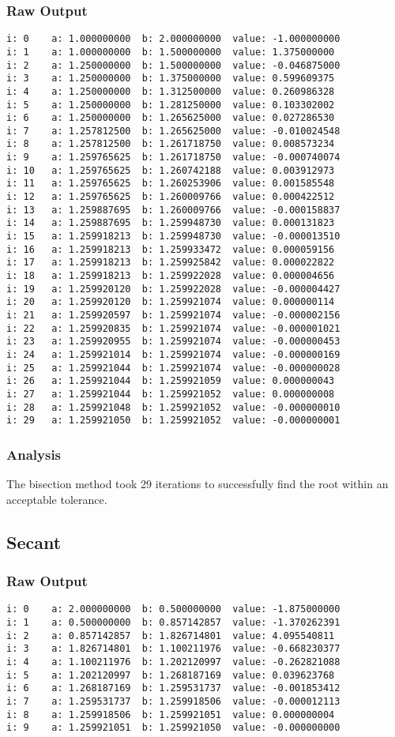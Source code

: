 \documentclass[11pt]{article} %
\begin{document}
\subsubsection*{Raw Output}
\begin{verbatim}
i: 0	a: 1.000000000	b: 2.000000000	value: -1.000000000 
i: 1	a: 1.000000000	b: 1.500000000	value: 1.375000000 
i: 2	a: 1.250000000	b: 1.500000000	value: -0.046875000 
i: 3	a: 1.250000000	b: 1.375000000	value: 0.599609375 
i: 4	a: 1.250000000	b: 1.312500000	value: 0.260986328 
i: 5	a: 1.250000000	b: 1.281250000	value: 0.103302002 
i: 6	a: 1.250000000	b: 1.265625000	value: 0.027286530 
i: 7	a: 1.257812500	b: 1.265625000	value: -0.010024548 
i: 8	a: 1.257812500	b: 1.261718750	value: 0.008573234 
i: 9	a: 1.259765625	b: 1.261718750	value: -0.000740074 
i: 10	a: 1.259765625	b: 1.260742188	value: 0.003912973 
i: 11	a: 1.259765625	b: 1.260253906	value: 0.001585548 
i: 12	a: 1.259765625	b: 1.260009766	value: 0.000422512 
i: 13	a: 1.259887695	b: 1.260009766	value: -0.000158837 
i: 14	a: 1.259887695	b: 1.259948730	value: 0.000131823 
i: 15	a: 1.259918213	b: 1.259948730	value: -0.000013510 
i: 16	a: 1.259918213	b: 1.259933472	value: 0.000059156 
i: 17	a: 1.259918213	b: 1.259925842	value: 0.000022822 
i: 18	a: 1.259918213	b: 1.259922028	value: 0.000004656 
i: 19	a: 1.259920120	b: 1.259922028	value: -0.000004427 
i: 20	a: 1.259920120	b: 1.259921074	value: 0.000000114 
i: 21	a: 1.259920597	b: 1.259921074	value: -0.000002156 
i: 22	a: 1.259920835	b: 1.259921074	value: -0.000001021 
i: 23	a: 1.259920955	b: 1.259921074	value: -0.000000453 
i: 24	a: 1.259921014	b: 1.259921074	value: -0.000000169 
i: 25	a: 1.259921044	b: 1.259921074	value: -0.000000028 
i: 26	a: 1.259921044	b: 1.259921059	value: 0.000000043 
i: 27	a: 1.259921044	b: 1.259921052	value: 0.000000008 
i: 28	a: 1.259921048	b: 1.259921052	value: -0.000000010 
i: 29	a: 1.259921050	b: 1.259921052	value: -0.000000001 
\end{verbatim}

\subsubsection*{Analysis}
The bisection method took 29 iterations to successfully find the root within an acceptable tolerance.
\subsection*{Secant}
\subsubsection*{Raw Output}
\begin{verbatim}
i: 0	a: 2.000000000	b: 0.500000000	value: -1.875000000
i: 1	a: 0.500000000	b: 0.857142857	value: -1.370262391
i: 2	a: 0.857142857	b: 1.826714801	value: 4.095540811
i: 3	a: 1.826714801	b: 1.100211976	value: -0.668230377
i: 4	a: 1.100211976	b: 1.202120997	value: -0.262821088
i: 5	a: 1.202120997	b: 1.268187169	value: 0.039623768
i: 6	a: 1.268187169	b: 1.259531737	value: -0.001853412
i: 7	a: 1.259531737	b: 1.259918506	value: -0.000012113
i: 8	a: 1.259918506	b: 1.259921051	value: 0.000000004
i: 9	a: 1.259921051	b: 1.259921050	value: -0.000000000
\end{verbatim}
\end{document}
